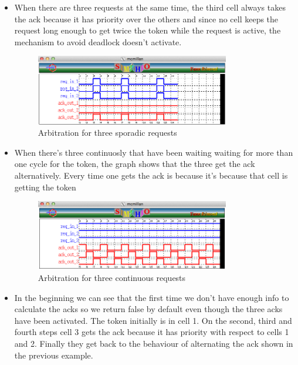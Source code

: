 \documentclass{article}
\begin{document}
\begin{itemize}
\item When there are three requests at the same time, the third cell always takes the
ack because it has priority over the others and since no cell keeps the request
long enough to get twice the token while the request is active, the mechanism to avoid
deadlock doesn't activate.

\begin{figure}[!ht]
\begin{center}
\includegraphics[width=0.8\textwidth, natwidth=610,natheight=642] {img/three-sporadic.png}
\end{center}
\label{three-sporadic}
\caption{Arbitration for three sporadic requests}
\end{figure}

\item When there's three continuosly that have been waiting waiting for more than one cycle
for the token, the graph shows that the three get the ack alternatively. Every time 
  one gets the ack is because it's because that cell is getting the token

\begin{figure}[!ht]
\begin{center}
\includegraphics[width=0.8\textwidth, natwidth=610,natheight=642] {img/three-continuosly.png}
\end{center}
\label{three-continuosly}
\caption{Arbitration for three continuous requests}
\end{figure}

\item In the beginning we can see that the first time we don't have enough info
to calculate the acks so we return false by default even though the three
acks have been activated. The token initially is in cell 1. On the second, third
and fourth steps cell 3 gets the ack because it has priority with respect to cells 
1 and 2. Finally they get back to the behaviour of alternating the ack shown in the
previous example.
 

\end{itemize}
\end{document}
